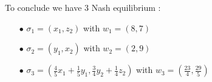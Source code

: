 To conclude we have 3 Nash equilibrium :
\begin{itemize}
  \item[$\bullet$]  $\sigma_1 = \left(x_1,z_2\right)$ with $w_1= \left(8,7\right)$
  \item[$\bullet$]  $\sigma_2 = \left(y_1,x_2\right)$ with $w_2= \left(2,9\right)$
  \item[$\bullet$]  $\sigma_3 = \left( \frac{4}{5}x_1 + \frac{1}{5}y_1, \frac{3}{4}y_2 + \frac{1}{4}z_2\right)$ with $w_3= \left(\frac{23}{4},\frac{29}{5}\right)$
\end{itemize}
